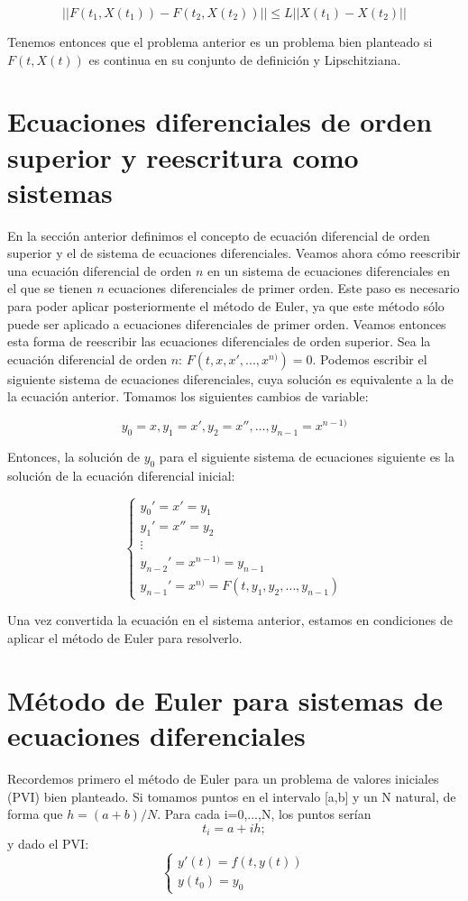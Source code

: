 \documentclass[12pt]{article}       %
\begin{document}
$$ ||F(t_1, X(t_1)) - F(t_2, X(t_2))|| \leq L||X(t_1) - X(t_2)||$$

Tenemos entonces que el problema anterior es un problema bien planteado si $F(t, X(t))$ es continua en su conjunto de definición y Lipschitziana.

\section{Ecuaciones diferenciales de orden superior y reescritura como sistemas}

En la sección anterior definimos el concepto de ecuación diferencial de orden superior y el de sistema de ecuaciones diferenciales. Veamos ahora cómo reescribir una ecuación diferencial de orden $n$ en un sistema de ecuaciones diferenciales en el que se tienen $n$ ecuaciones diferenciales de primer orden. Este paso es necesario para poder aplicar posteriormente el método de Euler, ya que este método sólo puede ser aplicado a ecuaciones diferenciales de primer orden. Veamos entonces esta forma de reescribir las ecuaciones diferenciales de orden superior. Sea la ecuación diferencial de orden $n$: $ F(t, x, x', ..., x^{n)}) = 0 $. Podemos escribir el siguiente sistema de ecuaciones diferenciales, cuya solución es equivalente a la de la ecuación anterior. Tomamos los siguientes cambios de variable:

$$y_0 = x, y_1 = x', y_2 = x'', \dots, y_{n-1} = x^{n-1)}$$

Entonces, la solución de $y_0$ para el siguiente sistema de ecuaciones siguiente es la solución de la ecuación diferencial inicial:

$$
\begin{cases}
y_0' = x' = y_1\\
y_1' = x'' = y_2\\
\vdots\\
y_{n-2}' = x^{n-1)} = y_{n-1}\\
y_{n-1}' = x^{n)} = F(t, y_1, y_2, \dots, y_{n-1})
\end{cases}
$$

Una vez convertida la ecuación en el sistema anterior, estamos en condiciones de aplicar el método de Euler para resolverlo.

\section{Método de Euler para sistemas de ecuaciones diferenciales}

Recordemos primero el método de Euler para un problema de valores iniciales (PVI) bien planteado. Si tomamos puntos en el intervalo [a,b] y un N natural, de forma que $h=(a+b)/N$. Para cada i=0,...,N, los puntos serían
$$ 
t_i=a+ih;
$$
y dado el PVI:
$$
\begin{cases}
y'(t)=f(t,y(t)) \\ 
y(t_0)=y_0
\end{cases}
$$
\end{document}
